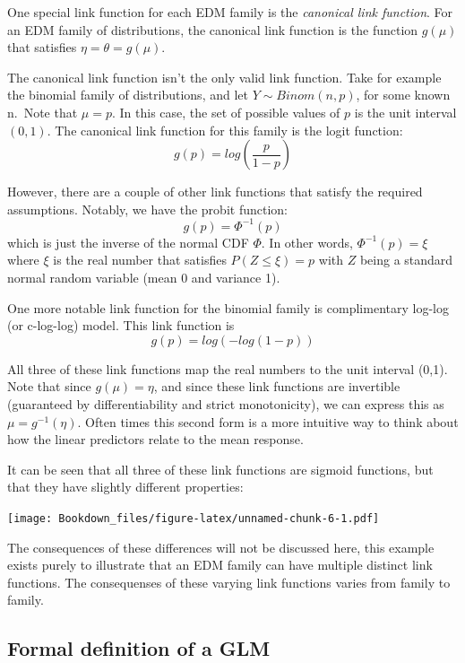 \documentclass[
]{book}
\begin{document}
One special link function for each EDM family is the \emph{canonical link function}. For an EDM family of distributions, the canonical link function is the function \(g(\mu)\) that satisfies \(\eta=\theta=g(\mu)\).

The canonical link function isn't the only valid link function. Take for example the binomial family of distributions, and let \(Y\sim Binom(n,p)\), for some known n.~Note that \(\mu = p\). In this case, the set of possible values of \(p\) is the unit interval \((0,1)\). The canonical link function for this family is the logit function:
\[
g(p) = log\left(\frac{p}{1-p}\right)
\]

However, there are a couple of other link functions that satisfy the required assumptions. Notably, we have the probit function:
\[
g(p)=\Phi^{-1}(p)
\]
which is just the inverse of the normal CDF \(\Phi\). In other words, \(\Phi^{-1}(p) = \xi\) where \(\xi\) is the real number that satisfies \(P(Z\leq\xi)=p\) with \(Z\) being a standard normal random variable (mean 0 and variance 1).

One more notable link function for the binomial family is complimentary log-log (or c-log-log) model. This link function is
\[
g(p) = log(-log(1-p))
\]

All three of these link functions map the real numbers to the unit interval (0,1). Note that since \(g(\mu)=\eta\), and since these link functions are invertible (guaranteed by differentiability and strict monotonicity), we can express this as \(\mu = g^{-1}(\eta)\). Often times this second form is a more intuitive way to think about how the linear predictors relate to the mean response.

It can be seen that all three of these link functions are sigmoid functions, but that they have slightly different properties:

\texttt{[image: Bookdown\_files/figure-latex/unnamed-chunk-6-1.pdf]}

The consequences of these differences will not be discussed here, this example exists purely to illustrate that an EDM family can have multiple distinct link functions. The consequenses of these varying link functions varies from family to family.

\hypertarget{formal-definition-of-a-glm}{%
\subsection{Formal definition of a GLM}\label{formal-definition-of-a-glm}}
\end{document}
